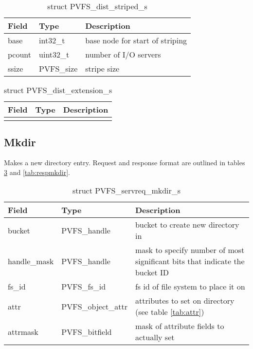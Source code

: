 \documentclass[11pt, letterpaper]{article} %
\begin{document}
\begin{table}[H]
\begin{tabular}{|l|l|l|}
\hline
Field & Type & Description \\
\hline
\hline
base & int32\_t & base node for start of striping\\
\hline
pcount & uint32\_t & number of I/O servers\\
\hline
ssize & PVFS\_size & stripe size\\
\hline
\end{tabular}
\caption{struct PVFS\_dist\_striped\_s \label{tab:striped}}
\end{table}

\begin{table}[H]
\begin{tabular}{|l|l|l|}
\hline
Field & Type & Description \\
\hline
\hline
[ EMPTY ] & & \\
\hline
\end{tabular}
\caption{struct PVFS\_dist\_extension\_s \label{tab:extension}}
\end{table}

\subsection{Mkdir}

Makes a new directory entry.  Request and response format are outlined
in tables \ref{tab:reqmkdir} and \ref{tab:respmkdir}.

\begin{table}[H]
\begin{tabular}{|l|l|l|}
\hline
Field & Type & Description \\
\hline
\hline
bucket & PVFS\_handle & bucket to create new directory in\\
\hline
handle\_mask & PVFS\_handle & mask to specify number of most significant
bits that indicate the bucket ID\\
\hline
fs\_id & PVFS\_fs\_id & fs id of file system to place it on\\
\hline
attr & PVFS\_object\_attr & attributes to set on directory (see table
\ref{tab:attr})\\
\hline
attrmask & PVFS\_bitfield & mask of attribute fields to actually set\\
\hline
\end{tabular}
\caption{struct PVFS\_servreq\_mkdir\_s \label{tab:reqmkdir}}
\end{table}
\end{document}
